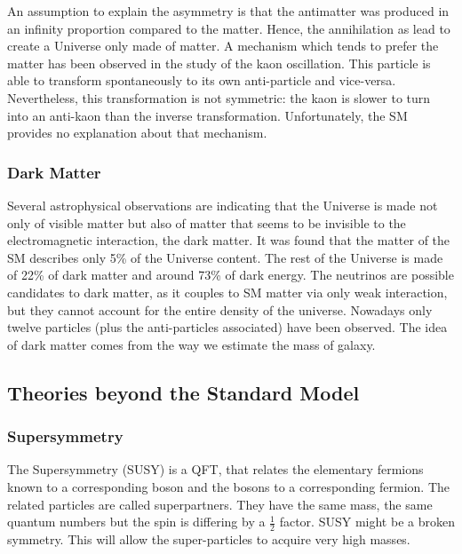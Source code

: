     An assumption to explain the asymmetry is that the antimatter was produced in an infinity proportion compared to the matter.
    Hence, the annihilation as lead to create a Universe only made of matter.
    A mechanism which tends to prefer the matter has been observed in the study of the kaon oscillation.
    This particle is able to transform spontaneously to its own anti-particle and vice-versa.
    Nevertheless, this transformation is not symmetric: the kaon is slower to turn into an anti-kaon than the inverse transformation.
    Unfortunately, the SM provides no explanation about that mechanism.
 
    \subsubsection{Dark Matter}
    
    Several astrophysical observations are indicating that the Universe is made not only of visible matter but also of matter that seems to be invisible to the electromagnetic interaction, the dark matter.
    It was found that the matter of the SM describes only 5\% of the Universe content. 
    The rest of the Universe is made of 22\% of dark matter and around 73\% of dark energy.
    The neutrinos are possible candidates to dark matter, as it couples to SM matter via only weak interaction, but they cannot account for the entire density of the universe.
    Nowadays only twelve particles (plus the anti-particles associated) have been observed. 
    The idea of dark matter comes from the way we estimate the mass of galaxy.

    \subsection{Theories beyond the Standard Model}

      \subsubsection{Supersymmetry}
    
      The Supersymmetry (SUSY) is a QFT, that relates the elementary fermions known to a corresponding boson and the bosons to a corresponding fermion.
      The related particles are called superpartners.
      They have the same mass, the same quantum numbers but the spin is differing by a $\frac{1}{2}$ factor.
      SUSY might be a broken symmetry. 
      This will allow the super-particles to acquire very high masses.

